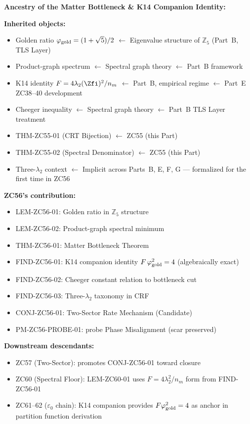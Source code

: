 \documentclass[12pt, a4paper]{article}
\begin{document}
\begin{genealogybox}[title={ZC56 Genealogy Map}]
\textbf{Ancestry of the Matter Bottleneck \& K14 Companion Identity:}

\smallskip
\textbf{Inherited objects:}
\begin{itemize}[leftmargin=1.5em]
\item Golden ratio $\varphi_{\rm gold}=(1+\sqrt{5})/2$ $\leftarrow$
  Eigenvalue structure of $\mathbb{Z}_{5}$ (Part~B, TLS Layer)
\item Product-graph spectrum $\leftarrow$ Spectral graph theory
  $\leftarrow$ Part~B framework
\item K14 identity $F=4\lambda_{2}(\Zfi)^{2}/n_{m}$ $\leftarrow$ Part~B,
  empirical regime $\leftarrow$ Part~E ZC38--40 development
\item Cheeger inequality $\leftarrow$ Spectral graph theory
  $\leftarrow$ Part~B TLS Layer treatment
\item THM-ZC55-01 (CRT Bijection) $\leftarrow$ ZC55 (this Part)
\item THM-ZC55-02 (Spectral Denominator) $\leftarrow$ ZC55 (this Part)
\item Three-$\lambda_{2}$ context $\leftarrow$ Implicit across Parts~B,
  E, F, G --- formalized for the first time in ZC56
\end{itemize}

\smallskip
\textbf{ZC56's contribution:}
\begin{itemize}[leftmargin=1.5em]
\item LEM-ZC56-01: Golden ratio in $\mathbb{Z}_{5}$ structure
\item LEM-ZC56-02: Product-graph spectral minimum
\item THM-ZC56-01: Matter Bottleneck Theorem
\item FIND-ZC56-01: K14 companion identity
  $F\,\varphi_{\rm gold}^{2}=4$ (algebraically exact)
\item FIND-ZC56-02: Cheeger constant relation to bottleneck cut
\item FIND-ZC56-03: Three-$\lambda_{2}$ taxonomy in CRF
\item CONJ-ZC56-01: Two-Sector Rate Mechanism (Candidate)
\item PM-ZC56-PROBE-01: probe Phase Misalignment (scar preserved)
\end{itemize}

\smallskip
\textbf{Downstream descendants:}
\begin{itemize}[leftmargin=1.5em]
\item ZC57 (Two-Sector): promotes CONJ-ZC56-01 toward closure
\item ZC60 (Spectral Floor): LEM-ZC60-01 uses
  $F=4\lambda_{2}^{2}/n_{m}$ form from FIND-ZC56-01
\item ZC61--62 ($\varepsilon_0$ chain): K14 companion provides
  $F\varphi_{\rm gold}^{2}=4$ as anchor in partition function derivation
\end{itemize}
\end{genealogybox}
\end{document}
